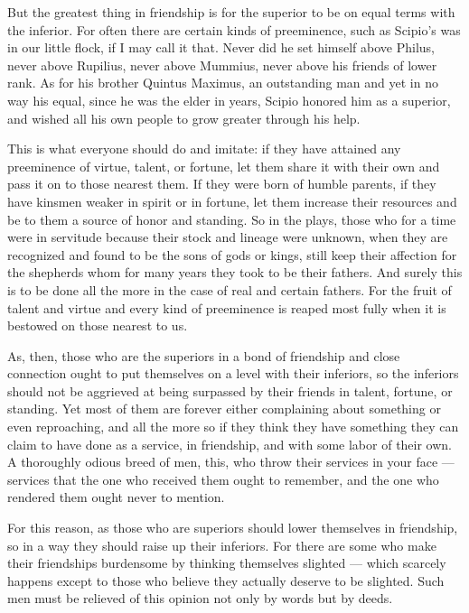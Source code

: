  But the greatest thing in friendship is for the superior to be on equal terms with the inferior. For often there are certain kinds of preeminence, such as Scipio's was in our little flock, if I may call it that. Never did he set himself above Philus, never above Rupilius, never above Mummius, never above his friends of lower rank. As for his brother Quintus Maximus, an outstanding man and yet in no way his equal, since he was the elder in years, Scipio honored him as a superior, and wished all his own people to grow greater through his help.

 This is what everyone should do and imitate: if they have attained any preeminence of virtue, talent, or fortune, let them share it with their own and pass it on to those nearest them. If they were born of humble parents, if they have kinsmen weaker in spirit or in fortune, let them increase their resources and be to them a source of honor and standing. So in the plays, those who for a time were in servitude because their stock and lineage were unknown, when they are recognized and found to be the sons of gods or kings, still keep their affection for the shepherds whom for many years they took to be their fathers. And surely this is to be done all the more in the case of real and certain fathers. For the fruit of talent and virtue and every kind of preeminence is reaped most fully when it is bestowed on those nearest to us.

 As, then, those who are the superiors in a bond of friendship and close connection ought to put themselves on a level with their inferiors, so the inferiors should not be aggrieved at being surpassed by their friends in talent, fortune, or standing. Yet most of them are forever either complaining about something or even reproaching, and all the more so if they think they have something they can claim to have done as a service, in friendship, and with some labor of their own. A thoroughly odious breed of men, this, who throw their services in your face — services that the one who received them ought to remember, and the one who rendered them ought never to mention.

 For this reason, as those who are superiors should lower themselves in friendship, so in a way they should raise up their inferiors. For there are some who make their friendships burdensome by thinking themselves slighted — which scarcely happens except to those who believe they actually deserve to be slighted. Such men must be relieved of this opinion not only by words but by deeds.

